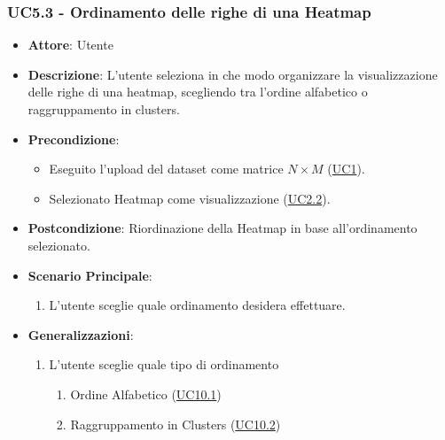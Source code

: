     \subsubsection{UC5.3 - Ordinamento delle righe di una Heatmap}
    \label{5.3}
    \begin{itemize}
    \item \textbf{Attore}: Utente
    \item \textbf{Descrizione}: L'utente seleziona in che modo organizzare la visualizzazione delle righe di una heatmap, scegliendo tra l'ordine alfabetico o raggruppamento in clusters.
    \item \textbf{Precondizione}: 
    \begin{itemize}
        \item Eseguito l'upload del dataset come matrice $N\times M$ (\hyperref[uc1]{UC1}).
        \item Selezionato Heatmap come visualizzazione (\hyperref[uc2.2]{UC2.2}).
    \end{itemize}  
    \item \textbf{Postcondizione}: Riordinazione della Heatmap in base all'ordinamento selezionato.
    \item \textbf{Scenario Principale}: 
    \begin{enumerate}
        \item L'utente sceglie quale ordinamento desidera effettuare.
    \end{enumerate}  
    \item \textbf{Generalizzazioni}: 
     \begin{enumerate}
            \item L'utente sceglie quale tipo di ordinamento
                \begin{enumerate}
                    \item Ordine Alfabetico (\hyperref[uc10.1]{UC10.1})
                    \item Raggruppamento in Clusters (\hyperref[uc10.2]{UC10.2})
                    \end{enumerate}
        \end{enumerate} 
    \end{itemize}
    
